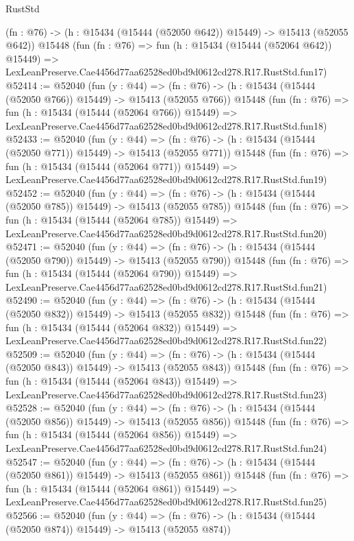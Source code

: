 \begin{lexlean}{RustStd}
\begin{coremodule}
    (fn : @76) -> (h : @15434 (@15444 (@52050 @642)) @15449) -> @15413 (@52055 @642))
    @15448
    (fun (fn : @76) =>
    fun (h : @15434 (@15444 (@52064 @642)) @15449) =>
    LexLeanPreserve.Cae4456d77aa62528ed0bd9d0612cd278.R17.RustStd.fun17)
@52414 := @52040
    (fun (y : @44) =>
    (fn : @76) -> (h : @15434 (@15444 (@52050 @766)) @15449) -> @15413 (@52055 @766))
    @15448
    (fun (fn : @76) =>
    fun (h : @15434 (@15444 (@52064 @766)) @15449) =>
    LexLeanPreserve.Cae4456d77aa62528ed0bd9d0612cd278.R17.RustStd.fun18)
@52433 := @52040
    (fun (y : @44) =>
    (fn : @76) -> (h : @15434 (@15444 (@52050 @771)) @15449) -> @15413 (@52055 @771))
    @15448
    (fun (fn : @76) =>
    fun (h : @15434 (@15444 (@52064 @771)) @15449) =>
    LexLeanPreserve.Cae4456d77aa62528ed0bd9d0612cd278.R17.RustStd.fun19)
@52452 := @52040
    (fun (y : @44) =>
    (fn : @76) -> (h : @15434 (@15444 (@52050 @785)) @15449) -> @15413 (@52055 @785))
    @15448
    (fun (fn : @76) =>
    fun (h : @15434 (@15444 (@52064 @785)) @15449) =>
    LexLeanPreserve.Cae4456d77aa62528ed0bd9d0612cd278.R17.RustStd.fun20)
@52471 := @52040
    (fun (y : @44) =>
    (fn : @76) -> (h : @15434 (@15444 (@52050 @790)) @15449) -> @15413 (@52055 @790))
    @15448
    (fun (fn : @76) =>
    fun (h : @15434 (@15444 (@52064 @790)) @15449) =>
    LexLeanPreserve.Cae4456d77aa62528ed0bd9d0612cd278.R17.RustStd.fun21)
@52490 := @52040
    (fun (y : @44) =>
    (fn : @76) -> (h : @15434 (@15444 (@52050 @832)) @15449) -> @15413 (@52055 @832))
    @15448
    (fun (fn : @76) =>
    fun (h : @15434 (@15444 (@52064 @832)) @15449) =>
    LexLeanPreserve.Cae4456d77aa62528ed0bd9d0612cd278.R17.RustStd.fun22)
@52509 := @52040
    (fun (y : @44) =>
    (fn : @76) -> (h : @15434 (@15444 (@52050 @843)) @15449) -> @15413 (@52055 @843))
    @15448
    (fun (fn : @76) =>
    fun (h : @15434 (@15444 (@52064 @843)) @15449) =>
    LexLeanPreserve.Cae4456d77aa62528ed0bd9d0612cd278.R17.RustStd.fun23)
@52528 := @52040
    (fun (y : @44) =>
    (fn : @76) -> (h : @15434 (@15444 (@52050 @856)) @15449) -> @15413 (@52055 @856))
    @15448
    (fun (fn : @76) =>
    fun (h : @15434 (@15444 (@52064 @856)) @15449) =>
    LexLeanPreserve.Cae4456d77aa62528ed0bd9d0612cd278.R17.RustStd.fun24)
@52547 := @52040
    (fun (y : @44) =>
    (fn : @76) -> (h : @15434 (@15444 (@52050 @861)) @15449) -> @15413 (@52055 @861))
    @15448
    (fun (fn : @76) =>
    fun (h : @15434 (@15444 (@52064 @861)) @15449) =>
    LexLeanPreserve.Cae4456d77aa62528ed0bd9d0612cd278.R17.RustStd.fun25)
@52566 := @52040
    (fun (y : @44) =>
    (fn : @76) -> (h : @15434 (@15444 (@52050 @874)) @15449) -> @15413 (@52055 @874))

\end{coremodule}
\end{lexlean}
